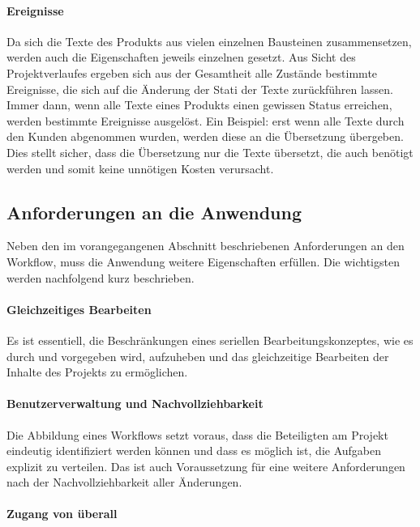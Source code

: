 \paragraph{Ereignisse} Da sich die Texte des Produkts aus vielen einzelnen Bausteinen zusammensetzen, werden auch die Eigenschaften jeweils einzelnen gesetzt. Aus Sicht des Projektverlaufes ergeben sich aus der Gesamtheit alle Zustände bestimmte Ereignisse, die sich auf die Änderung der Stati der Texte zurückführen lassen. Immer dann, wenn alle Texte eines Produkts einen gewissen Status erreichen, werden bestimmte Ereignisse ausgelöst. Ein Beispiel: erst wenn alle Texte durch den Kunden abgenommen wurden, werden diese an die Übersetzung übergeben. Dies stellt sicher, dass die Übersetzung nur die Texte übersetzt, die auch benötigt werden und somit keine unnötigen Kosten verursacht.

\subsection{Anforderungen an die Anwendung}\label{l:anforderungen}

Neben den im vorangegangenen Abschnitt beschriebenen Anforderungen an den Workflow, muss die Anwendung weitere Eigenschaften erfüllen. Die wichtigsten werden nachfolgend kurz beschrieben.

\paragraph{Gleichzeitiges Bearbeiten}

Es ist essentiell, die Beschränkungen eines seriellen Bearbeitungskonzeptes, wie es durch  und  vorgegeben wird, aufzuheben und das gleichzeitige Bearbeiten der Inhalte des Projekts zu ermöglichen. 

\paragraph{Benutzerverwaltung und Nachvollziehbarkeit}

Die Abbildung eines Workflows setzt voraus, dass die Beteiligten am Projekt eindeutig identifiziert werden können und dass es möglich ist, die Aufgaben explizit zu verteilen. Das ist auch Voraussetzung für eine weitere Anforderungen nach der Nachvollziehbarkeit aller Änderungen.

\paragraph{Zugang von überall}

